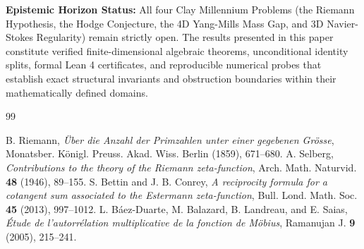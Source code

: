 \documentclass[11pt,a4paper]{article}
\theoremstyle{definition}
\begin{document}
\vspace{0.5em}
\noindent\textbf{Epistemic Horizon Status:} All four Clay Millennium Problems (the Riemann Hypothesis, the Hodge Conjecture, the 4D Yang-Mills Mass Gap, and 3D Navier-Stokes Regularity) remain strictly open. The results presented in this paper constitute verified finite-dimensional algebraic theorems, unconditional identity splits, formal Lean 4 certificates, and reproducible numerical probes that establish exact structural invariants and obstruction boundaries within their mathematically defined domains.

\begin{thebibliography}{99}

 B. Riemann, \emph{\"Uber die Anzahl der Primzahlen unter einer gegebenen Gr\"osse}, Monatsber. K\"onigl. Preuss. Akad. Wiss. Berlin (1859), 671--680.
 A. Selberg, \emph{Contributions to the theory of the Riemann zeta-function}, Arch. Math. Naturvid. \textbf{48} (1946), 89--155.
 S. Bettin and J. B. Conrey, \emph{A reciprocity formula for a cotangent sum associated to the Estermann zeta-function}, Bull. Lond. Math. Soc. \textbf{45} (2013), 997--1012.
 L. B\'aez-Duarte, M. Balazard, B. Landreau, and E. Saias, \emph{\'Etude de l'autorr\'elation multiplicative de la fonction de M\"obius}, Ramanujan J. \textbf{9} (2005), 215--241.

\end{thebibliography}
\end{document}
